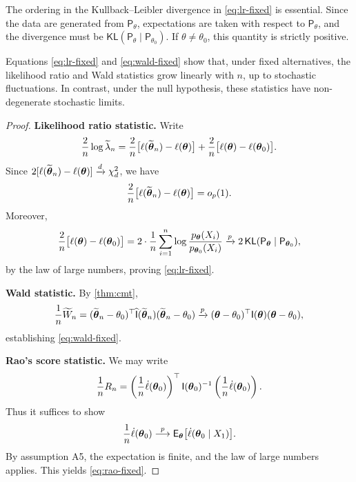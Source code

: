\begin{remark}
The ordering in the Kullback--Leibler divergence in \eqref{eq:lr-fixed} is essential.
Since the data are generated from \(\mathsf{P}_{\theta}\), expectations are taken with respect to \(\mathsf{P}_{\theta}\), and the divergence must be \(\mathsf{KL}(\mathsf{P}_{\theta} \mid \mathsf{P}_{\theta_0})\).
If \(\theta \neq \theta_0\), this quantity is strictly positive.
\end{remark}

\begin{remark}
Equations \eqref{eq:lr-fixed} and \eqref{eq:wald-fixed} show that, under fixed alternatives,
the likelihood ratio and Wald statistics grow linearly with \(n\), up to stochastic fluctuations.
In contrast, under the null hypothesis, these statistics have non-degenerate stochastic limits.
\end{remark}


\begin{proof}
\textbf{Likelihood ratio statistic.}
Write
\begin{equation*}\label{eq:lr-decomp}
\frac{2}{n} \log \widetilde{\lambda}_n
=
\frac{2}{n}
\big[
\ell(\widetilde{\boldsymbol{\theta}}_n) - \ell(\boldsymbol{\theta})
\big]
+
\frac{2}{n}
\big[
\ell(\boldsymbol{\theta}) - \ell(\boldsymbol{\theta}_0)
\big].
\end{equation*}
Since
\(2[\ell(\widetilde{\boldsymbol{\theta}}_n) - \ell(\boldsymbol{\theta})] \xrightarrow{d} \chi^2_d\),
we have
\[
\frac{2}{n}
\big[
\ell(\widetilde{\boldsymbol{\theta}}_n) - \ell(\boldsymbol{\theta})
\big]
= o_p(1).
\]
Moreover,
\[
\frac{2}{n}
\big[
\ell(\boldsymbol{\theta}) - \ell(\boldsymbol{\theta}_0)
\big]
=
2 \cdot \frac{1}{n}
\sum_{i=1}^n
\log \frac{p_{\boldsymbol{\theta}}(X_i)}{p_{\boldsymbol{\theta}_0}(X_i)}
\xrightarrow{p}
2 \, \mathsf{KL}(\mathsf{P}_{\boldsymbol{\theta}} \mid \mathsf{P}_{\boldsymbol{\theta}_0}),
\]
by the law of large numbers, proving \eqref{eq:lr-fixed}.

\medskip

\textbf{Wald statistic.}
By \autoref{thm:cmt},
\[
\frac{1}{n} \widetilde{W}_n
=
(\widetilde{\boldsymbol{\theta}}_n - \theta_0)^{\top}
\widehat{\mathsf{I}}(\widetilde{\boldsymbol{\theta}}_n)
(\widetilde{\boldsymbol{\theta}}_n - \theta_0)
\xrightarrow{p}
(\boldsymbol{\theta} - \theta_0)^{\top}
\mathsf{I}(\boldsymbol{\theta})
(\boldsymbol{\theta} - \theta_0),
\]
establishing \eqref{eq:wald-fixed}.

\medskip

\textbf{Rao's score statistic.}
We may write
\[
\frac{1}{n} R_n
=
\left(
\frac{1}{n} \dot{\ell}(\boldsymbol{\theta}_0)
\right)^{\top}
\mathsf{I}(\boldsymbol{\theta}_0)^{-1}
\left(
\frac{1}{n} \dot{\ell}(\boldsymbol{\theta}_0)
\right).
\]
Thus it suffices to show
\[
\frac{1}{n} \dot{\ell}(\boldsymbol{\theta}_0)
\stackrel{p}{\longrightarrow}
\mathsf{E}_{\boldsymbol{\theta}}
\big[
\dot{\ell}(\boldsymbol{\theta}_0 \mid X_1)
\big].
\]
By assumption A5, the expectation is finite, and the law of large numbers applies.
This yields \eqref{eq:rao-fixed}.
\end{proof}

